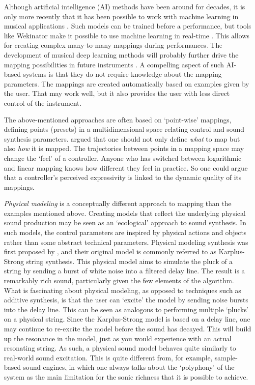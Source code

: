 Although artificial intelligence (AI) methods have been around for decades, it is only more recently that it has been possible to work with machine learning in musical applications \citep{inesta_machine_2018}. Such models can be trained before a performance, but tools like Wekinator make it possible to use machine learning in real-time \citep{fiebrink_wekinator_2010}. This allows for creating complex many-to-many mappings during performances. The development of musical deep learning methods will probably further drive the mapping possibilities in future instruments \citep{briot_deep_2019}.
A compelling aspect of such AI-based systems is that they do not require knowledge about the mapping parameters. The mappings are created automatically based on examples given by the user. That may work well, but it also provides the user with less direct control of the instrument.

The above-mentioned approaches are often based on `point-wise' mappings, defining points (presets) in a multidimensional space relating control and sound synthesis parameters. \citet{van_nort_modular_2010} argued that one should not only define \emph{what} to map but also \emph{how} it is mapped. The trajectories between points in a mapping space may change the `feel' of a controller. Anyone who has switched between logarithmic and linear mapping knows how different they feel in practice. So one could argue that a controller's perceived expressivity is linked to the dynamic quality of its mappings.

\emph{Physical modeling} is a conceptually different approach to mapping than the examples mentioned above. Creating models that reflect the underlying physical sound production may be seen as an `ecological' approach to sound synthesis. In such models, the control parameters are inspired by physical actions and objects rather than some abstract technical parameters.
Physical modeling synthesis was first proposed by \citet{karplus_digital_1983}, and their original model is commonly referred to as Karplus-Strong string synthesis. This physical model aims to simulate the pluck of a string by sending a burst of white noise into a filtered delay line. The result is a remarkably rich sound, particularly given the few elements of the algorithm. What is fascinating about physical modeling, as opposed to techniques such as additive synthesis, is that the user can `excite' the model by sending noise bursts into the delay line. This can be seen as analogous to performing multiple `plucks' on a physical string. Since the Karplus-Strong model is based on a delay line, one may continue to re-excite the model before the sound has decayed. This will build up the resonance in the model, just as you would experience with an actual resonating string. As such, a physical sound model behaves quite similarly to real-world sound excitation. This is quite different from, for example, sample-based sound engines, in which one always talks about the `polyphony' of the system as the main limitation for the sonic richness that it is possible to achieve.

